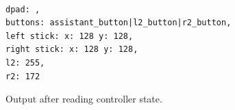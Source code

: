% 
% 

\begin{code}
\begin{verbatim}

dpad: ,
buttons: assistant_button|l2_button|r2_button,
left stick: x: 128 y: 128,
right stick: x: 128 y: 128,
l2: 255,
r2: 172
\end{verbatim}
\caption{Output after reading controller state.}
\label{code:wasi_controller_sample_output}
\end{code}

